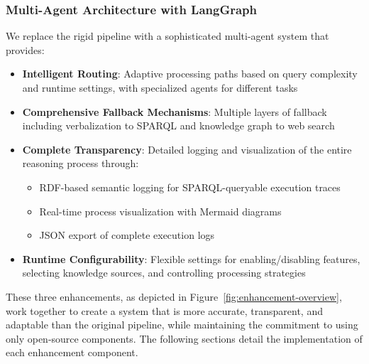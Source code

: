 \subsubsection{Multi-Agent Architecture with LangGraph}

We replace the rigid pipeline with a sophisticated multi-agent system that provides:

\begin{itemize}
    \item \textbf{Intelligent Routing}: Adaptive processing paths based on query complexity and runtime settings, with specialized agents for different tasks
    
    \item \textbf{Comprehensive Fallback Mechanisms}: Multiple layers of fallback including verbalization to SPARQL and knowledge graph to web search
    
    \item \textbf{Complete Transparency}: Detailed logging and visualization of the entire reasoning process through:
    \begin{itemize}
        \item RDF-based semantic logging for SPARQL-queryable execution traces
        \item Real-time process visualization with Mermaid diagrams
        \item JSON export of complete execution logs
    \end{itemize}
    
    \item \textbf{Runtime Configurability}: Flexible settings for enabling/disabling features, selecting knowledge sources, and controlling processing strategies
\end{itemize}

These three enhancements, as depicted in Figure~\ref{fig:enhancement-overview}, work together to create a system that is more accurate, transparent, and adaptable than the original pipeline, while maintaining the commitment to using only open-source components. The following sections detail the implementation of each enhancement component.


